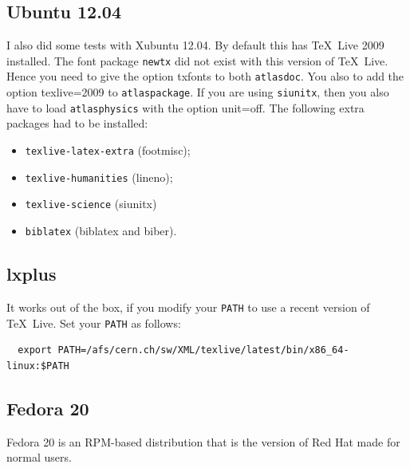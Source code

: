 \documentclass[atlasstyle,UKenglish]{latex/atlasdoc}
\newcommand{\Option}[1]{\textsf{#1}\xspace}
\newcommand{\Package}[1]{\texttt{#1}\xspace}
\begin{document}
\subsection{Ubuntu 12.04}

I also did some tests with Xubuntu 12.04.
By default this has \TeX\ Live 2009 installed.
The font package \Package{newtx} did not exist with this version of \TeX\ Live.
Hence you need to give the option \Option{txfonts} to both \Package{atlasdoc}.
You also to add the option \Option{texlive=2009} to \Package{atlaspackage}.
If you are using \Package{siunitx}, then you also have to load \Package{atlasphysics}
with the option \Option{unit=off}.
The following extra packages had to be installed:
\begin{itemize}\setlength{\parskip}{0pt}\setlength{\itemsep}{0pt}
\item \Package{texlive-latex-extra} (footmisc);
\item \Package{texlive-humanities} (lineno);
\item \Package{texlive-science} (siunitx)
\item \Package{biblatex} (biblatex and biber).
\end{itemize}


\subsection{lxplus} 

It works out of the box, if you modify your \texttt{PATH} to use a recent version of \TeX\ Live.
Set your \texttt{PATH} as follows:
\begin{verbatim}
  export PATH=/afs/cern.ch/sw/XML/texlive/latest/bin/x86_64-linux:$PATH
\end{verbatim}


\subsection{Fedora 20} 

Fedora 20 is an RPM-based distribution that is the version of Red Hat made for normal users.
\end{document}
